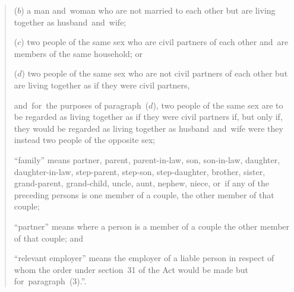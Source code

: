 \documentclass[12pt,a4paper]{article}
\begin{document}
\begin{enumerate}
\begin{quotation}
\begin{enumerate}
\begin{enumerate}
($b$) 
a man and~woman who are not married to each other but are living together as husband~and~wife;

($c$) 
two people of the same sex who are civil partners of each other and~are members of the same household; or

($d$) 
two people of the same sex who are not civil partners of each other but are living together as if they were civil partners,
\end{enumerate}
and~for~the purposes of paragraph~($d$), two people of the same sex are to be regarded as living together as if they were civil partners if, but only if, they would be regarded as living together as husband~and~wife were they instead two people of the opposite sex;

“family” means partner, parent, parent-in-law, son, son-in-law, daughter, daughter-in-law, step-parent, step-son, step-daughter, brother, sister, grand-parent, grand-child, uncle, aunt, nephew, niece, or~if any of the preceding persons is one member of a couple, the other member of that couple;

“partner” means where a person is a member of a couple the other member of that couple; and

“relevant employer” means the employer of a liable person in respect of whom the order under section~31 of the Act would be made but for~paragraph~(3).”.
\end{enumerate}
\end{quotation}
\end{enumerate}
\end{document}
